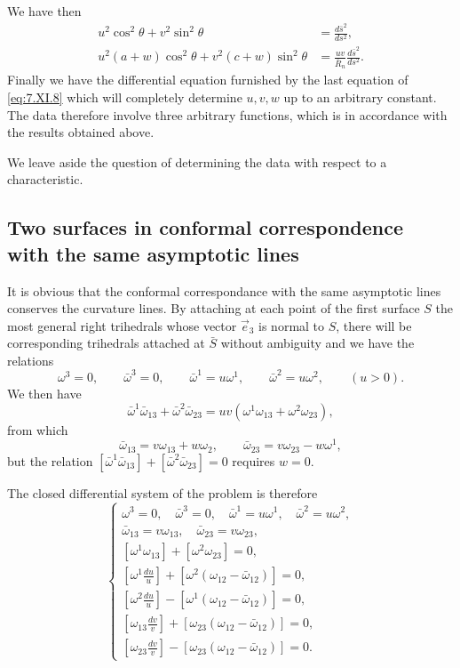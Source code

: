 \documentclass[leqno,11pt]{book}
\numberwithin{equation}{chapter}
\theoremstyle{shape1}
\theoremstyle{shape0}
\theoremstyle{shape2}
\theoremstyle{definition}
\begin{document}
We have then
\begin{align*}
  u^{2}\cos^{2}\theta+v^{2}\sin^{2}\theta&=\frac{d\bar s^{2}}{ds^{2}},\\
  u^{2}(a+w)\cos^{2}\theta+v^{2}(c+w)\sin^{2}\theta&=\frac{uv}{\bar R_{n}}\frac{d\bar s^{2}}{ds^{2}}.
\end{align*}
Finally we have the differential equation furnished by the last equation of \eqref{eq:7.XI.8} which will completely determine $u, v, w$ up to an arbitrary constant. The data therefore involve three arbitrary functions, which is in accordance with the results obtained above.

We leave aside the question of determining the data with respect to a characteristic.


\subsection[{Two surfaces in conformal correspondence with the same asymptotic lines}]{Two surfaces in conformal correspondence\\with the same asymptotic lines}
\label{sec:some-surf-conf}

\fsec It is obvious that the conformal correspondance with the same asymptotic lines conserves the curvature lines. By attaching at each point of the first surface $S$ the most general right trihedrals whose vector $\vec e_{3}$ is normal to $S$, there will be corresponding trihedrals attached at $\bar S$ without ambiguity and we have the relations
\[
\omega^{3}=0,\qquad\bar\omega^{3}=0,\qquad\bar\omega^{1}=u\omega^{1},\qquad\bar\omega^{2}=u\omega^{2},\qquad(u>0).
\]
We then have
\[
\bar\omega^{1}\bar\omega_{13}+\bar\omega^{2}\bar\omega_{23}=uv(\omega^{1}\omega_{13}+\omega^{2}\omega_{23}),
\]
from which
\[
\bar\omega_{13}=v\omega_{13}+w\omega_{2},\qquad\bar\omega_{23}=v\omega_{23}-w\omega^{1},
\]
but the relation $[\bar\omega^{1}\bar\omega_{13}]+[\bar\omega^{2}\bar\omega_{23}]=0$ requires $w=0$.

The closed differential system of the problem is therefore
\begin{equation}
  \label{eq:7.XII.1}\tag{XII, 1}
  \left\{
    \begin{gathered}
      \omega^{3}=0,\quad\bar\omega^{3}=0,\quad\bar\omega^{1}=u\omega^{1},\quad\bar\omega^{2}=u\omega^{2},\\
      \bar\omega_{13}=v\omega_{13},\quad\bar\omega_{23}=v\omega_{23},\\
      [\omega^{1}\omega_{13}]+[\omega^{2}\omega_{23}]=0,\\
      \left[\omega^{1}\frac{du}{u}\right]+[\omega^{2}(\omega_{12}-\bar\omega_{12})]=0,\\
      \left[\omega^{2}\frac{du}{u}\right]-[\omega^{1}(\omega_{12}-\bar\omega_{12})]=0,\\
      \left[\omega_{13}\frac{dv}{v}\right]+[\omega_{23}(\omega_{12}-\bar\omega_{12})]=0,\\
      \left[\omega_{23}\frac{dv}{v}\right]-[\omega_{23}(\omega_{12}-\bar\omega_{12})]=0.
    \end{gathered}
  \right.
\end{equation}
\end{document}
